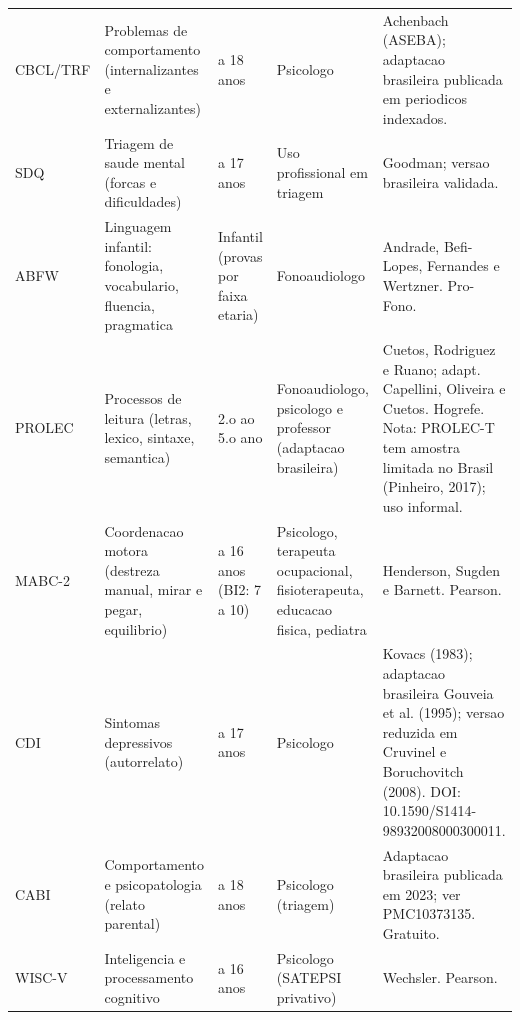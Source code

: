 \documentclass[a4paper,11pt]{book}
\begin{document}
\begin{longtable}{@{}>{\raggedright\arraybackslash}p{3.0cm}>{\raggedright\arraybackslash}p{3.6cm}>{\raggedright\arraybackslash}p{1.8cm}>{\raggedright\arraybackslash}p{2.7cm}>{\raggedright\arraybackslash}p{4.1cm}@{}}
CBCL/TRF & Problemas de comportamento (internalizantes e externalizantes) & 6 a 18 anos & Psicologo & Achenbach (ASEBA); adaptacao brasileira publicada em periodicos indexados. \\
SDQ & Triagem de saude mental (forcas e dificuldades) & 4 a 17 anos & Uso profissional em triagem & Goodman; versao brasileira validada. \\
ABFW & Linguagem infantil: fonologia, vocabulario, fluencia, pragmatica & Infantil (provas por faixa etaria) & Fonoaudiologo & Andrade, Befi-Lopes, Fernandes e Wertzner. Pro-Fono. \\
PROLEC & Processos de leitura (letras, lexico, sintaxe, semantica) & 2.o ao 5.o ano & Fonoaudiologo, psicologo e professor (adaptacao brasileira) & Cuetos, Rodriguez e Ruano; adapt. Capellini, Oliveira e Cuetos. Hogrefe. Nota: PROLEC-T tem amostra limitada no Brasil (Pinheiro, 2017); uso informal. \\
MABC-2 & Coordenacao motora (destreza manual, mirar e pegar, equilibrio) & 3 a 16 anos (BI2: 7 a 10) & Psicologo, terapeuta ocupacional, fisioterapeuta, educacao fisica, pediatra & Henderson, Sugden e Barnett. Pearson. \\
CDI & Sintomas depressivos (autorrelato) & 7 a 17 anos & Psicologo & Kovacs (1983); adaptacao brasileira Gouveia et al. (1995); versao reduzida em Cruvinel e Boruchovitch (2008). DOI: 10.1590/\hspace{0pt}S1414-98932008000300011. \\
CABI & Comportamento e psicopatologia (relato parental) & 6 a 18 anos & Psicologo (triagem) & Adaptacao brasileira publicada em 2023; ver PMC10373135. Gratuito. \\
WISC-V & Inteligencia e processamento cognitivo & 6 a 16 anos & Psicologo (SATEPSI privativo) & Wechsler. Pearson. \\
\bottomrule
\end{longtable}
\end{document}
